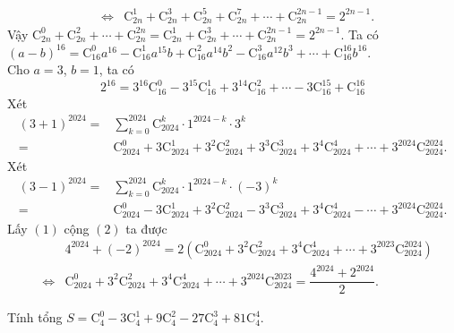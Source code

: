 \begin{ex}
{\begin{itemchoice}
\begin{eqnarray*}
				&\Leftrightarrow& \mathrm{C}_{2n}^1 + \mathrm{C}_{2n}^3 + \mathrm{C}_{2n}^5  + \mathrm{C}_{2n}^7 + \cdots + \mathrm{C}_{2n}^{2n-1} =2^{2n-1}.
			\end{eqnarray*}
			Vậy $\mathrm{C}_{2n}^0 + \mathrm{C}_{2n}^2  + \cdots + \mathrm{C}_{2n}^{2n}=\mathrm{C}_{2n}^1 + \mathrm{C}_{2n}^3 + \cdots + \mathrm{C}_{2n}^{2n-1}=2^{2n-1}$.
			 \itemch Ta có
			$(a-b)^{16}=\mathrm{C}_{16}^{0}a^{16}-\mathrm{C}_{16}^{1}a^{15}b+\mathrm{C}_{16}^{2}a^{14}b^{2}-\mathrm{C}_{16}^{3}a^{12}b^3+ \cdots  +\mathrm{C}_{16}^{16}b^{16}$.\\
			Cho $a=3$, $b=1$,  ta có
			\[2^{16}=3^{16}\mathrm{C}_{16}^{0}-3^{15}\mathrm{C}_{16}^{1}+3^{14}\mathrm{C}_{16}^{2}+  \cdots-3\mathrm{C}_{16}^{15}+\mathrm{C}_{16}^{16}\]
			 \itemch Xét
			 \allowdisplaybreaks
			\begin{align*}
				 (3+1)^{2024}=&\displaystyle\sum\limits_{k=0}^{2024} \mathrm{C}_{2024}^k \cdot 1^{2024-k} \cdot 3^{k} \\
				 =&\mathrm{C}_{2024}^0 + 3\mathrm{C}_{2024}^1 + 3^2\mathrm{C}_{2024}^2 + 3^3\mathrm{C}_{2024}^3 +3^4 \mathrm{C}_{2024}^4 + \cdots +3^{2024} \mathrm{C}_{2024}^{2024}.\tag{1}
			\end{align*}
			Xét 
			 \allowdisplaybreaks
			\begin{align*}
				(3-1)^{2024}=&\displaystyle\sum\limits_{k=0}^{2024} \mathrm{C}_{2024}^k  \cdot 1^{2024-k} \cdot (-3)^{k} \\
				=&\mathrm{C}_{2024}^0 - 3\mathrm{C}_{2024}^1 + 3^2\mathrm{C}_{2024}^2 - 3^3\mathrm{C}_{2024}^3 +3^4 \mathrm{C}_{2024}^4 - \cdots +3^{2024}  \mathrm{C}_{2024}^{2024}.\tag{2}
			\end{align*}
			Lấy $ (1) $ cộng  $ (2) $ ta được
			\allowdisplaybreaks 
			\begin{eqnarray*}
				&& 4^{2024} + (-2)^{2024} =2 \left(\mathrm{C}_{2024}^0 + 3^2\mathrm{C}_{2024}^2 + 3^4\mathrm{C}_{2024}^4 +  \cdots + 3^{2023}\mathrm{C}_{2024}^{2024} \right) \\
				&\Leftrightarrow&\mathrm{C}_{2024}^0 + 3^2\mathrm{C}_{2024}^2 + 3^4\mathrm{C}_{2024}^4 +  \cdots + 3^{2024}\mathrm{C}_{2024}^{2023} = \dfrac{4^{2024}+2^{2024}}{2}.
			\end{eqnarray*}
		\end{itemchoice}
	} 
\end{ex}



\begin{bt}%
	Tính tổng $S = \mathrm{C}^{0}_{4}-3\mathrm{C}^{1}_{4} + 9\mathrm{C}^{2}_{4}  -27\mathrm{C}^{3}_{4}+81\mathrm{C}^{4}_{4}$.
\end{bt}

